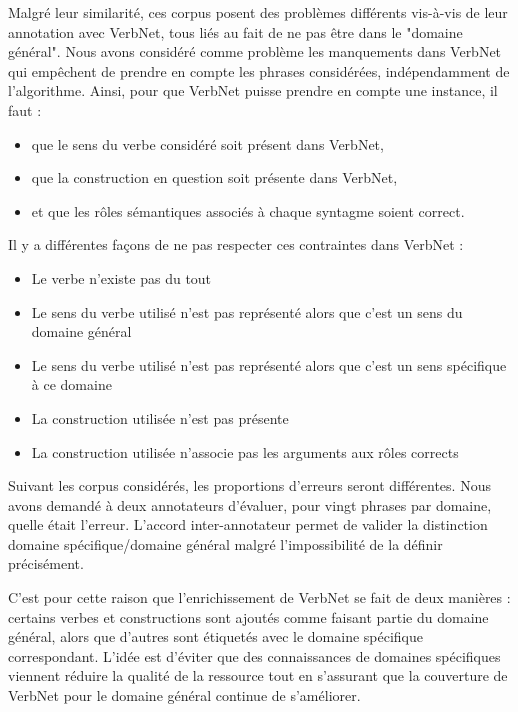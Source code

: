 Malgré leur similarité, ces corpus posent des problèmes différents vis-à-vis de
leur annotation avec VerbNet, tous liés au fait de ne pas être dans le "domaine
général". Nous avons considéré comme problème les manquements dans VerbNet qui
empêchent de prendre en compte les phrases considérées, indépendamment de
l'algorithme. Ainsi, pour que VerbNet puisse prendre en compte une instance, il
faut :

\begin{itemize}
    \item que le sens du verbe considéré soit présent dans VerbNet,
    \item que la construction en question soit présente dans VerbNet,
    \item et que les rôles sémantiques associés à chaque syntagme soient correct.
\end{itemize}

Il y a différentes façons de ne pas respecter ces contraintes dans VerbNet :

\begin{itemize}
    \item Le verbe n'existe pas du tout
    \item Le sens du verbe utilisé n'est pas représenté alors que c'est un sens
        du domaine général
    \item Le sens du verbe utilisé n'est pas représenté alors que c'est un sens
        spécifique à ce domaine
    \item La construction utilisée n'est pas présente
    \item La construction utilisée n'associe pas les arguments aux rôles
        corrects
\end{itemize}

Suivant les corpus considérés, les proportions d'erreurs seront différentes.
Nous avons demandé à deux annotateurs d'évaluer, pour vingt phrases par
domaine, quelle était l'erreur. L'accord inter-annotateur permet de valider la
distinction domaine spécifique/domaine général malgré l'impossibilité de la
définir précisément.


C'est pour cette raison que l'enrichissement de VerbNet se fait de deux
manières : certains verbes et constructions sont ajoutés comme faisant partie
du domaine général, alors que d'autres sont étiquetés avec le domaine
spécifique correspondant. L'idée est d'éviter que des connaissances de domaines
spécifiques viennent réduire la qualité de la ressource tout en s'assurant que
la couverture de VerbNet pour le domaine général continue de s'améliorer.

